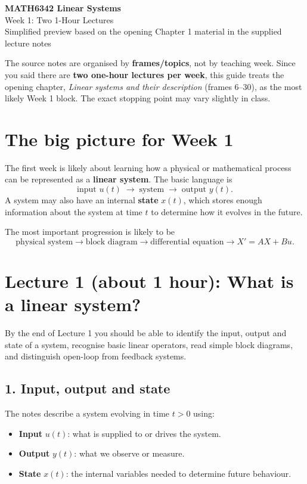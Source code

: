 \documentclass[11pt,a4paper]{article}
\begin{document}
\begin{center}
{\Huge\bfseries MATH6342 Linear Systems}\\[4pt]
{\LARGE Week 1: Two 1-Hour Lectures}\\[8pt]
{\large Simplified preview based on the opening Chapter 1 material in the supplied lecture notes}\\[10pt]
\end{center}

\begin{keybox}
The source notes are organised by \textbf{frames/topics}, not by teaching week. Since you said there are \textbf{two one-hour lectures per week}, this guide treats the opening chapter, \emph{Linear systems and their description} (frames 6--30), as the most likely Week 1 block. The exact stopping point may vary slightly in class.
\end{keybox}

\section*{The big picture for Week 1}
The first week is likely about learning how a physical or mathematical process can be represented as a \textbf{linear system}. The basic language is
\[
\boxed{\text{input }u(t)}\;\longrightarrow\;\boxed{\text{system}}\;\longrightarrow\;\boxed{\text{output }y(t)}.
\]
A system may also have an internal \textbf{state} $x(t)$, which stores enough information about the system at time $t$ to determine how it evolves in the future.

The most important progression is likely to be
\[
\text{physical system}
\longrightarrow \text{block diagram}
\longrightarrow \text{differential equation}
\longrightarrow \boxed{X'=AX+Bu}.
\]

\section*{Lecture 1 (about 1 hour): What is a linear system?}

\begin{goalbox}
By the end of Lecture 1 you should be able to identify the input, output and state of a system, recognise basic linear operators, read simple block diagrams, and distinguish open-loop from feedback systems.
\end{goalbox}

\subsection*{1. Input, output and state}
The notes describe a system evolving in time $t>0$ using:
\begin{itemize}[leftmargin=1.5em]
\item \textbf{Input} $u(t)$: what is supplied to or drives the system.
\item \textbf{Output} $y(t)$: what we observe or measure.
\item \textbf{State} $x(t)$: the internal variables needed to determine future behaviour.
\end{itemize}
\end{document}
